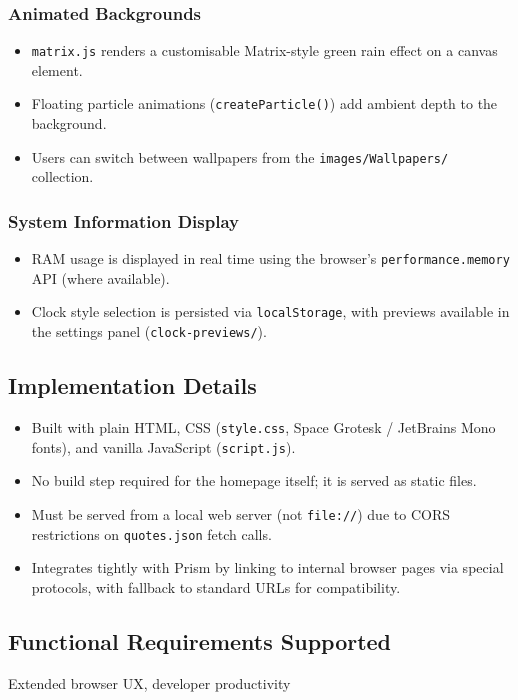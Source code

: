 \subsubsection*{Animated Backgrounds}
\begin{itemize}[leftmargin=*]
    \item \texttt{matrix.js} renders a customisable Matrix-style green rain effect on a canvas element.
    \item Floating particle animations (\texttt{createParticle()}) add ambient depth to the background.
    \item Users can switch between wallpapers from the \texttt{images/Wallpapers/} collection.
\end{itemize}

\subsubsection*{System Information Display}
\begin{itemize}[leftmargin=*]
    \item RAM usage is displayed in real time using the browser's \texttt{performance.memory} API (where available).
    \item Clock style selection is persisted via \texttt{localStorage}, with previews available in the settings panel (\texttt{clock-previews/}).
\end{itemize}

\subsection{Implementation Details}
\begin{itemize}[leftmargin=*]
    \item Built with plain HTML, CSS (\texttt{style.css}, Space Grotesk / JetBrains Mono fonts), and vanilla JavaScript (\texttt{script.js}).
    \item No build step required for the homepage itself; it is served as static files.
    \item Must be served from a local web server (not \texttt{file://}) due to CORS restrictions on \texttt{quotes.json} fetch calls.
    \item Integrates tightly with Prism by linking to internal browser pages via special protocols, with fallback to standard URLs for compatibility.
\end{itemize}

\subsection{Functional Requirements Supported}
Extended browser UX, developer productivity

